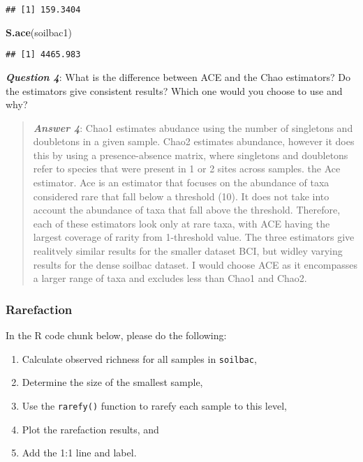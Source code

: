 \documentclass[
]{article}
\newenvironment{Shaded}{\begin{snugshade}}{\end{snugshade}}
\newcommand{\FunctionTok}[1]{\textcolor[rgb]{0.13,0.29,0.53}{\textbf{#1}}}
\newcommand{\NormalTok}[1]{#1}
\begin{document}
\begin{verbatim}
## [1] 159.3404
\end{verbatim}

\begin{Shaded}
\begin{Highlighting}[]
\FunctionTok{S.ace}\NormalTok{(soilbac1)}
\end{Highlighting}
\end{Shaded}

\begin{verbatim}
## [1] 4465.983
\end{verbatim}

\textbf{\emph{Question 4}}: What is the difference between ACE and the
Chao estimators? Do the estimators give consistent results? Which one
would you choose to use and why?

\begin{quote}
\textbf{\emph{Answer 4}}: Chao1 estimates abudance using the number of
singletons and doubletons in a given sample. Chao2 estimates abundance,
however it does this by using a presence-absence matrix, where
singletons and doubletons refer to species that were present in 1 or 2
sites across samples. the Ace estimator. Ace is an estimator that
focuses on the abundance of taxa considered rare that fall below a
threshold (10). It does not take into account the abundance of taxa that
fall above the threshold. Therefore, each of these estimators look only
at rare taxa, with ACE having the largest coverage of rarity from
1-threshold value. The three estimators give realitvely similar results
for the smaller dataset BCI, but widley varying results for the dense
soilbac dataset. I would choose ACE as it encompasses a larger range of
taxa and excludes less than Chao1 and Chao2.
\end{quote}

\subsubsection{Rarefaction}\label{rarefaction}

In the R code chunk below, please do the following:

\begin{enumerate}
\def\labelenumi{\arabic{enumi}.}
\item
  Calculate observed richness for all samples in \texttt{soilbac},
\item
  Determine the size of the smallest sample,
\item
  Use the \texttt{rarefy()} function to rarefy each sample to this
  level,
\item
  Plot the rarefaction results, and
\item
  Add the 1:1 line and label.
\end{enumerate}
\end{document}
